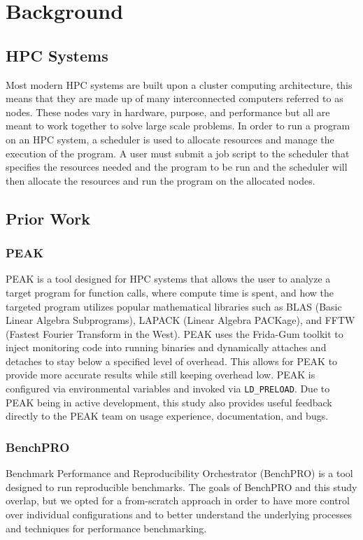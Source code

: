 \documentclass[conference]{IEEEtran}
\begin{document}
\section{Background}

\subsection{HPC Systems}
Most modern HPC systems are built upon a cluster computing architecture, this means that they are made up of many interconnected computers referred to as nodes. These nodes vary in hardware, purpose, and performance but all are meant to work together to solve large scale problems. In order to run a program on an HPC system, a scheduler is used to allocate resources and manage the execution of the program. A user must submit a job script to the scheduler that specifies the resources needed and the program to be run and the scheduler will then allocate the resources and run the program on the allocated nodes.

\subsection{Prior Work}

\subsubsection{PEAK}
PEAK is a tool designed for HPC systems that allows the user to analyze a target program for function calls, where compute time is spent, and how the targeted program utilizes popular mathematical libraries such as BLAS (Basic Linear Algebra Subprograms), LAPACK (Linear Algebra PACKage), and FFTW (Fastest Fourier Transform in the West). PEAK uses the Frida-Gum toolkit to inject monitoring code into running binaries and dynamically attaches and detaches to stay below a specified level of overhead. This allows for PEAK to provide more accurate results while still keeping overhead low. PEAK is configured via environmental variables and invoked via \texttt{LD\_PRELOAD}. Due to PEAK being in active development, this study also provides useful feedback directly to the PEAK team on usage experience, documentation, and bugs.

\subsubsection{BenchPRO}
Benchmark Performance and Reproducibility Orchestrator (BenchPRO) is a tool designed to run reproducible benchmarks. The goals of BenchPRO and this study overlap, but we opted for a from-scratch approach in order to have more control over individual configurations and to better understand the underlying processes and techniques for performance benchmarking.
\end{document}

